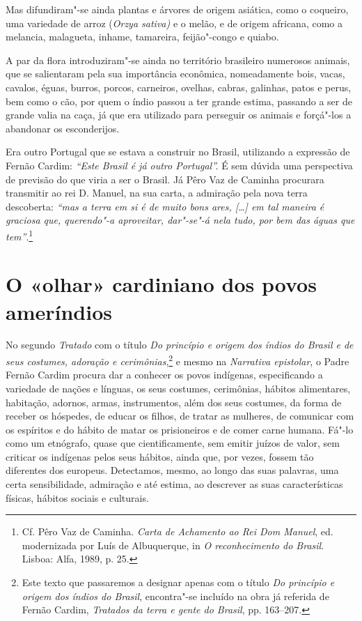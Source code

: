 Mas difundiram"-se ainda plantas e árvores de origem asiática, como o
coqueiro, uma variedade de arroz (\textit{Orzya sativa)} e o melão, e de
origem africana, como a melancia, malagueta, inhame, tamareira,
feijão"-congo e quiabo.

A par da flora introduziram"-se ainda no território brasileiro
numerosos animais, que se salientaram pela sua importância econômica,
nomeadamente bois, vacas, cavalos, éguas, burros, porcos, carneiros,
ovelhas, cabras, galinhas, patos e perus, bem como o cão, por quem o
índio passou a ter grande estima, passando a ser de grande valia na
caça, já que era utilizado para perseguir os animais e forçá"-los a
abandonar os esconderijos.

Era outro Portugal que se estava a construir no Brasil, utilizando a
expressão de Fernão Cardim: \textit{``Este Brasil é já outro Portugal''.} 
É sem dúvida uma perspectiva de previsão do que viria a ser o Brasil.
Já Pêro Vaz de Caminha procurara transmitir ao rei D. Manuel, na sua
carta, a admiração pela nova terra descoberta: \textit{``mas a
terra em si é de muito bons ares, [\ldots{}] em tal maneira é graciosa que,
querendo"-a aproveitar, dar"-se"-á nela tudo, por bem das águas que
tem''}.\footnote{ Cf. Pêro Vaz de Caminha. \textit{Carta de
Achamento ao Rei Dom Manuel}, ed. modernizada por Luís de Albuquerque,
in \textit{O reconhecimento do Brasil}. Lisboa: Alfa, 1989, p. 25.} 

\section{O «olhar» cardiniano dos povos ameríndios} 

 No segundo \textit{Tratado} com o título \textit{Do
princípio e origem dos índios do Brasil e de seus costumes, adoração e
cerimônias},\footnote{ Este texto que passaremos a designar apenas
com o título \textit{Do princípio e origem dos índios do Brasil}, 
encontra"-se incluído na obra já referida de Fernão Cardim,
\textit{Tratados da terra e gente do Brasil}, pp. 163--207.} e mesmo na
\textit{Narrativa epistolar}, o Padre Fernão Cardim procura dar a
conhecer os povos indígenas, especificando a variedade de nações e
línguas, os seus costumes, cerimônias, hábitos alimentares, habitação,
adornos, armas, instrumentos, além dos seus costumes, da forma
de receber os hóspedes, de educar os filhos, de tratar as mulheres, de
comunicar com os espíritos e do hábito de matar os prisioneiros e de
comer carne humana. Fá"-lo como um etnógrafo, quase que
cientificamente, sem emitir juízos de valor, sem criticar os indígenas
pelos seus hábitos, ainda que, por vezes, fossem tão diferentes dos
europeus. Detectamos, mesmo, ao longo das suas palavras, uma certa
sensibilidade, admiração e até estima, ao descrever as suas
características físicas, hábitos sociais e culturais.

